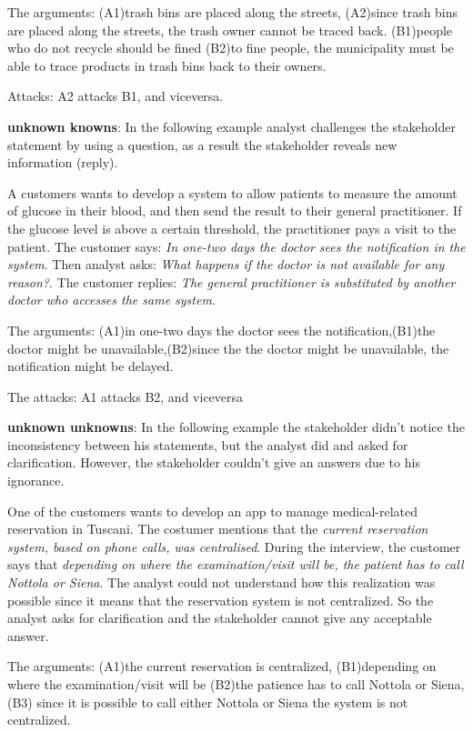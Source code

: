 \documentclass[]{llncs}
\begin{document}
The arguments: (A1)trash bins are placed along the streets, (A2)since
trash bins are placed along the streets, the trash owner cannot be
traced back. (B1)people who do not recycle should be fined (B2)to fine
people, the municipality must be able to trace products in trash bins
back to their owners.

Attacks: A2 attacks B1, and viceversa.

\textbf{unknown knowns}: In the following example analyst challenges the
stakeholder statement by using a question, as a result the stakeholder
reveals new information (reply).

A customers wants to develop a system to allow patients to measure the
amount of glucose in their blood, and then send the result to their
general practitioner. If the glucose level is above a certain threshold,
the practitioner pays a visit to the patient. The customer says:
\emph{In one-two days the doctor sees the notification in the system}.
Then analyst asks: \emph{What happens if the doctor is not available for
any reason?}. The customer replies: \emph{The general practitioner is
substituted by another doctor who accesses the same system}.

The arguments: (A1)in one-two days the doctor sees the
notification,(B1)the doctor might be unavailable,(B2)since the the
doctor might be unavailable, the notification might be delayed.

The attacks: A1 attacks B2, and viceversa

\textbf{unknown unknowns}: In the following example the stakeholder
didn't notice the inconsistency between his statements, but the analyst
did and asked for clarification. However, the stakeholder couldn't give
an answers due to his ignorance.

One of the customers wants to develop an app to manage medical-related
reservation in Tuscani. The costumer mentions that the \emph{current
reservation system, based on phone calls, was centralised}. During the
interview, the customer says that \emph{depending on where the
examination/visit will be, the patient has to call Nottola or Siena}.
The analyst could not understand how this realization was possible since
it means that the reservation system is not centralized. So the analyst
asks for clarification and the stakeholder cannot give any acceptable
answer.

The arguments: (A1)the current reservation is centralized, (B1)depending
on where the examination/visit will be (B2)the patience has to call
Nottola or Siena, (B3) since it is possible to call either Nottola or
Siena the system is not centralized.
\end{document}

